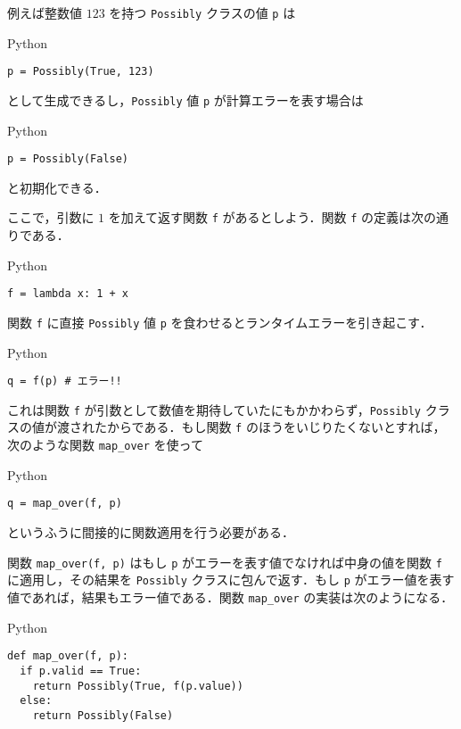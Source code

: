 \documentclass[a4paper,draft]{jsbook}
\newcommand{\programminglanguage}[1]{\textsf{#1}}
\newcommand{\python}{\programminglanguage{Python}}
\newcommand{\code}[1]{\texttt{#1}}
\newenvironment{pythoncode}{\begin{itembox}[r]{\python}}{\end{itembox}}
\begin{document}
例えば整数値 $123$ を持つ \code{Possibly} クラスの値 \code{p} は
\begin{pythoncode}
\begin{verbatim}
p = Possibly(True, 123)
\end{verbatim}
\end{pythoncode}
として生成できるし，\code{Possibly} 値 \code{p} が計算エラーを表す場合は
\begin{pythoncode}
\begin{verbatim}
p = Possibly(False)
\end{verbatim}
\end{pythoncode}
と初期化できる．

ここで，引数に $1$ を加えて返す関数 \code{f} があるとしよう．関数 \code{f} の定義は次の通りである．
\begin{pythoncode}
\begin{verbatim}
f = lambda x: 1 + x
\end{verbatim}
\end{pythoncode}

関数 \code{f} に直接 \code{Possibly} 値 \code{p} を食わせるとランタイムエラーを引き起こす．
\begin{pythoncode}
\begin{verbatim}
q = f(p) # エラー!!
\end{verbatim}
\end{pythoncode}
これは関数 \code{f} が引数として数値を期待していたにもかかわらず，\code{Possibly} クラスの値が渡されたからである．もし関数 \code{f} のほうをいじりたくないとすれば，次のような関数 \code{map\_over} を使って
\begin{pythoncode}
\begin{verbatim}
q = map_over(f, p)
\end{verbatim}
\end{pythoncode}
というふうに間接的に関数適用を行う必要がある．

関数 \code{map\_over(f, p)} はもし \code{p} がエラーを表す値でなければ中身の値を関数 \code{f} に適用し，その結果を \code{Possibly} クラスに包んで返す．もし \code{p} がエラー値を表す値であれば，結果もエラー値である．関数 \code{map\_over} の実装は次のようになる．
\begin{pythoncode}
\begin{verbatim}
def map_over(f, p):
  if p.valid == True:
    return Possibly(True, f(p.value))
  else:
    return Possibly(False)
\end{verbatim}
\end{pythoncode}
\end{document}
